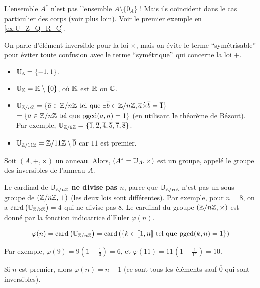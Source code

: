 \documentclass[12pt, a4paper]{report}
\begin{document}
\begin{attention}
    L'ensemble $A^*$ n'est pas l'ensemble $A\setminus\{0_A\}$ ! Mais ils coïncident dans le cas particulier des corps (voir plus loin). Voir le premier exemple en \ref{ex:U_Z_Q_R_C}.
\end{attention}

\begin{remark}
    On parle d'élément inversible pour la loi $\times$, mais on évite le terme ``symétrisable'' pour éviter toute confusion avec le terme ``symétrique'' qui concerne la loi $+$.
\end{remark}

\begin{example}
    
    \begin{itemize}
        \item $\mathbb{U}_{\mathbb{Z}} = \{-1,1\}$.
        \item $\mathbb{U}_{\mathbb{K}} = \mathbb{K}\setminus\{0\}$, où $\mathbb{K}$ est $\mathbb{R}$ ou $\mathbb{C}$.
        \item $\mathbb{U}_{\mathbb{Z}/n\mathbb{Z}} = \{\overline{a} \in \mathbb{Z}/n\mathbb{Z} \text{ tel que } \exists \overline{b} \in \mathbb{Z}/n\mathbb{Z}, \overline{a} \dot\times \overline{b} = \overline{1}\}$\\$=\{\overline{a} \in \mathbb{Z}/n\mathbb{Z} \text{ tel que } \mathrm{pgcd} (a,n) = 1\}$ (en utilisant le théorème de Bézout).\\Par exemple, $\mathbb{U}_{\mathbb{Z}/9\mathbb{Z}} = \{\overline{1}, \overline{2}, \overline{4}, \overline{5}, \overline{7}, \overline{8}\}$.
        \item $\mathbb{U}_{\mathbb{Z}/11\mathbb{Z}} = \mathbb{Z}/11\mathbb{Z}\setminus{\overline{0}}$ car $11$ est premier.
    \end{itemize}
\end{example}
\label{ex:U_Z_Q_R_C}

\begin{property}
    Soit $(A,+,\times)$ un anneau. Alors, $(A^*=\mathbb{U}_A,\times)$ est un groupe, appelé le groupe des inversibles de l'anneau $A$.
\end{property}

\begin{remark}
    Le cardinal de $\mathbb{U}_{\mathbb{Z}/n\mathbb{Z}}$ \textbf{ne divise pas $n$}, parce que $\mathbb{U}_{\mathbb{Z}/n\mathbb{Z}}$ n'est pas un sous-groupe de $(\mathbb{Z}/n\mathbb{Z},+)$ (les deux lois sont différentes). Par exemple, pour $n=8$, on a $\mathrm{card}\left(\mathbb{U}_{\mathbb{Z}/8\mathbb{Z}}\right)=4$ qui ne divise pas $8$. Le cardinal du groupe $(\mathbb{Z}/n\mathbb{Z},\times)$ est donné par la fonction indicatrice d'Euler $\varphi(n)$.

    $$\varphi(n) = \mathrm{card}\left(\mathbb{U}_{\mathbb{Z}/n\mathbb{Z}}\right) = \mathrm{card}\left(\{k\in[\![1,n]\!] \text{ tel que } \mathrm{pgcd}(k,n) = 1\}\right)$$

    Par exemple, $\varphi(9) = 9 \left(1 - \frac{1}{3}\right) = 6$, et $\varphi(11) = 11 \left(1 - \frac{1}{11}\right) = 10$.

    Si $n$ est premier, alors $\varphi(n) = n - 1$ (ce sont tous les éléments sauf $\overline{0}$ qui sont inversibles).
\end{remark}
\end{document}
